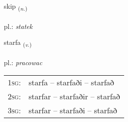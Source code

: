 \documentclass[frontgrid, backgrid]{flacards}\usepackage[]{graphicx}\usepackage[]{xcolor}
\begin{document}
{skip \small{\textsubscript{(\textit{n.})}} \\[1ex] %
\textphonetic{[scɪːp]} \\
pl.: \emph{statek} \\  [2ex]
\renewcommand*{\arraystretch}{0.8}
}

\renewcommand{\flhead}{\vskip5pt \fboxsep=0pt {\small\bfseries\footnotesize Sagnorð | Verb}}
\renewcommand{\fcfoot}{\vskip5pt \fboxsep=0pt \hspace{2pt}{\small\bfseries\footnotesize 1K}}

\renewcommand{\blhead}{\vskip5pt {\small\bfseries\footnotesize Sagnorð | Verb }}
\renewcommand{\bcfoot}{\vskip5pt \hspace{2pt}{\small\bfseries\footnotesize 1K}}


{starfa \small{\textsubscript{(\textit{v.})}} \\[1ex] %
\textphonetic{[starva]} \\
pl.: \emph{pracowac} \\  [2ex]
\renewcommand*{\arraystretch}{0.8}
\begin{tabular}{p{1cm}l}
\textsc{1sg}: & starfa -- starfaði -- starfað \\ 
\textsc{2sg}: & starfar -- starfaðir -- starfað \\ 
\textsc{3sg}: & starfar -- starfaði -- starfað \\ 
\end{tabular}
}

\renewcommand{\flhead}{\vskip5pt \fboxsep=0pt {\small\bfseries\footnotesize Nafnorð | Noun}}
\renewcommand{\fcfoot}{\vskip5pt \fboxsep=0pt \hspace{2pt}{\small\bfseries\footnotesize 1K}}
\end{document}
